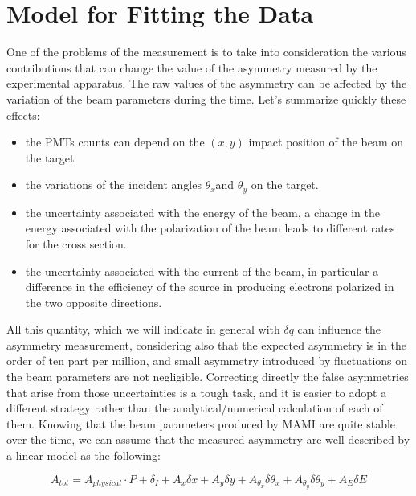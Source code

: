 \section{Model for Fitting the Data} \label{Model}


One of the problems of the measurement is to take into consideration the various contributions that can change the value of the asymmetry measured by the experimental apparatus. The raw values of the asymmetry can be affected by the variation of the beam parameters during the time. Let's summarize quickly these effects:
\begin{itemize}
\item the PMTs counts  can depend on the $(x,y)$ impact position of the beam on the target
\item the variations of the incident angles $\theta_{x}$and $\theta_{y}$ on the target.
\item the uncertainty associated with the energy of the beam, a change in the energy associated with the polarization of the beam leads to different rates for the cross section.
\item the uncertainty associated with the current of the beam, in particular a difference in the 
efficiency of the source in producing electrons polarized in the two opposite directions.
\end{itemize}

All this quantity, which we will indicate in general with $\delta q$ can influence the asymmetry measurement, considering also that the expected asymmetry is in the order of ten part per million, and small asymmetry introduced by fluctuations on the beam parameters are not negligible. Correcting directly the false asymmetries that arise from those uncertainties is a tough task, and it is easier to adopt a different strategy rather than the analytical/numerical calculation of each of them. Knowing that the beam parameters produced by MAMI are quite stable over the time, we can assume that the measured asymmetry are well described by a linear model as the following:

\begin{equation}
A_{tot} = A_{physical} \cdot P + \delta_{I} + A_{x} \delta x + A_{y} \delta y + A_{\theta_{x}} \delta \theta_{x} + A_{\theta_{y}} \delta \theta_{y}+ A_{E} \delta E 
\end{equation}

